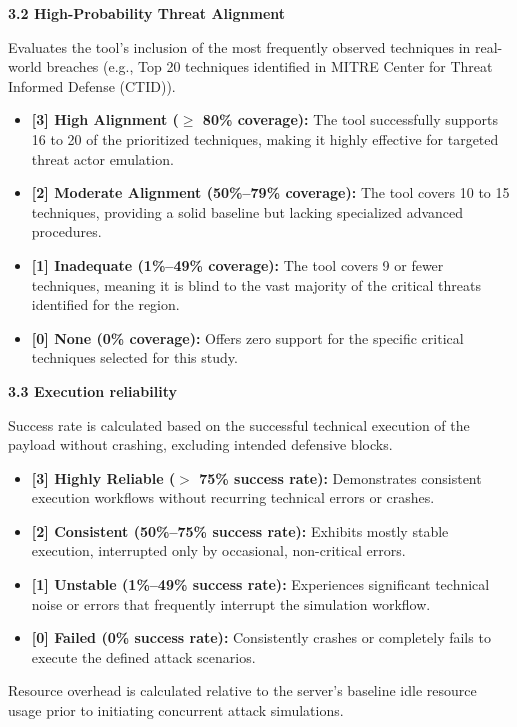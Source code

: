 \begin{description}
    \textbf{3.2 High-Probability Threat Alignment} \hfill \par
    Evaluates the tool's inclusion of the most frequently observed techniques in real-world breaches (e.g., Top 20 techniques identified in MITRE Center for Threat Informed Defense (CTID)).
    \begin{itemize}
        \item \textbf{[3] High Alignment ($\ge$ 80\% coverage):} The tool successfully supports 16 to 20 of the prioritized techniques, making it highly effective for targeted threat actor emulation.
        \item \textbf{[2] Moderate Alignment (50\%--79\% coverage):} The tool covers 10 to 15 techniques, providing a solid baseline but lacking specialized advanced procedures.
        \item \textbf{[1] Inadequate (1\%--49\% coverage):} The tool covers 9 or fewer techniques, meaning it is blind to the vast majority of the critical threats identified for the region.
        \item \textbf{[0] None (0\% coverage):} Offers zero support for the specific critical techniques selected for this study.
    \end{itemize}
    
    \textbf{3.3 Execution reliability} \hfill \par
    Success rate is calculated based on the successful technical execution of the payload without crashing, excluding intended defensive blocks.
    \begin{itemize}
        \item \textbf{[3] Highly Reliable ($>$ 75\% success rate):} Demonstrates consistent execution workflows without recurring technical errors or crashes.
        \item \textbf{[2] Consistent (50\%--75\% success rate):} Exhibits mostly stable execution, interrupted only by occasional, non-critical errors.
        \item \textbf{[1] Unstable (1\%--49\% success rate):} Experiences significant technical noise or errors that frequently interrupt the simulation workflow.
        \item \textbf{[0] Failed (0\% success rate):} Consistently crashes or completely fails to execute the defined attack scenarios.
    \end{itemize}

    \item[4. Operational Performance \& Output Quality]  \hfill \par
    Resource overhead is calculated relative to the server's baseline idle resource usage prior to initiating concurrent attack simulations.


\end{description}
